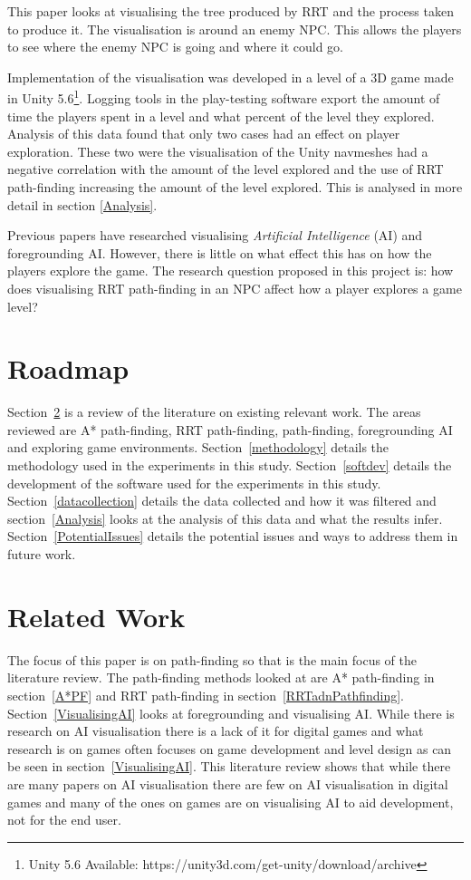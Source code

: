 \documentclass[journal]{IEEEtran}
\begin{document}
	This paper looks at visualising the tree produced by RRT and the process taken to produce it. The visualisation is around an enemy NPC. This allows the players to see where the enemy NPC is going and where it could go. 
	
	Implementation of the visualisation was developed in a level of a 3D game made in Unity 5.6\footnote[1]{Unity 5.6 Available: https://unity3d.com/get-unity/download/archive}. Logging tools in the play-testing software export the amount of time the players spent in a level and what percent of the level they explored. Analysis of this data found that only two cases had an effect on player exploration. These two were the visualisation of the Unity navmeshes had a negative correlation with the amount of the level explored and the use of RRT path-finding increasing the amount of the level explored. This is analysed in more detail in section \ref{Analysis}.
	
	Previous papers have researched visualising \textit{Artificial Intelligence} (AI) and foregrounding AI. However, there is little on what effect this has on how the players explore the game.
	The research question proposed in this project is: how does visualising RRT path-finding in an NPC affect how a player explores a game level?
	
	\section{Roadmap}
	Section~\ref{RelatedWork} is a review of the literature on existing relevant work. The areas reviewed are A* path-finding, RRT path-finding, path-finding, foregrounding AI and exploring game environments. 
	Section~\ref{methodology} details the methodology used in the experiments in this study. Section~\ref{softdev} details the development of the software used for the experiments in this study.
	Section~\ref{datacollection} details the data collected and how it was filtered and section~\ref{Analysis} looks at the analysis of this data and what the results infer. Section~\ref{PotentialIssues} details the potential issues and ways to address them in future work.
	
	\section{Related Work} \label{RelatedWork}
	The focus of this paper is on path-finding so that is the main focus of the literature review. The path-finding methods looked at are A* path-finding in section~\ref{A*PF} and RRT path-finding in section~\ref{RRTadnPathfinding}.  Section~\ref{VisualisingAI} looks at foregrounding and visualising AI. While there is research on AI visualisation there is a lack of it for digital games and what research is on games often focuses on game development and level design as can be seen in section~\ref{VisualisingAI}. 
	This literature review shows that while there are many papers on AI visualisation there are few on AI visualisation in digital games and many of the ones on games are on visualising AI to aid development, not for the end user. 	
	
\end{document}
